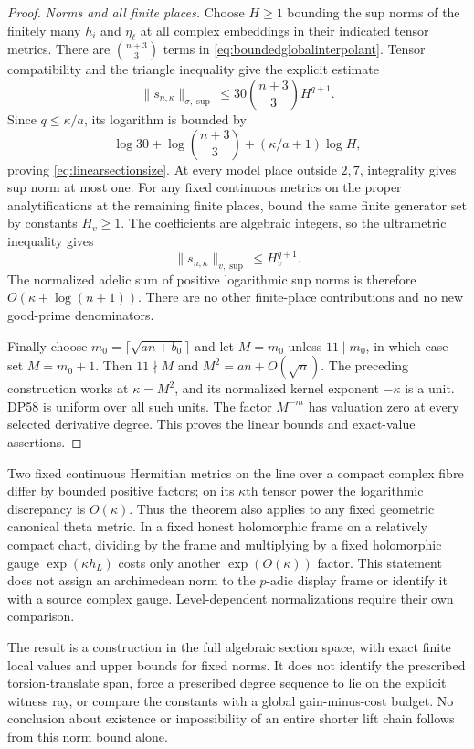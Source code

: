 \begin{proof}
\emph{Norms and all finite places.}
Choose $H\ge1$ bounding the sup norms of the finitely many $h_i$ and $\eta_\ell$ at all complex embeddings in their indicated tensor metrics.
There are $\binom{n+3}{3}$ terms in \eqref{eq:boundedglobalinterpolant}.
Tensor compatibility and the triangle inequality give the explicit estimate
\[
 \|s_{n,\kappa}\|_{\sigma,\sup}
 \le30\binom{n+3}{3}H^{q+1}.
\]
Since $q\le\kappa/a$, its logarithm is bounded by
\[
 \log30+\log\binom{n+3}{3}
       +(\kappa/a+1)\log H,
\]
proving \eqref{eq:linearsectionsize}.
At every model place outside $2,7$, integrality gives sup norm at most one.
For any fixed continuous metrics on the proper analytifications at the remaining finite places, bound the same finite generator set by constants $H_v\ge1$.
The coefficients are algebraic integers, so the ultrametric inequality gives
\[
 \|s_{n,\kappa}\|_{v,\sup}\le H_v^{q+1}.
\]
The normalized adelic sum of positive logarithmic sup norms is therefore $O(\kappa+\log(n+1))$.
There are no other finite-place contributions and no new good-prime denominators.

Finally choose $m_0=\lceil\sqrt{an+b_0}\rceil$ and let $M=m_0$ unless $11\mid m_0$, in which case set $M=m_0+1$.
Then $11\nmid M$ and $M^2=an+O(\sqrt n)$.
The preceding construction works at $\kappa=M^2$, and its normalized kernel exponent $-\kappa$ is a unit.
DP58 is uniform over all such units.
The factor $M^{-m}$ has valuation zero at every selected derivative degree.
This proves the linear bounds and exact-value assertions.
\end{proof}

Two fixed continuous Hermitian metrics on the line over a compact complex fibre differ by bounded positive factors; on its $\kappa$th tensor power the logarithmic discrepancy is $O(\kappa)$.
Thus the theorem also applies to any fixed geometric canonical theta metric.
In a fixed honest holomorphic frame on a relatively compact chart, dividing by the frame and multiplying by a fixed holomorphic gauge $\exp(\kappa h_L)$ costs only another $\exp(O(\kappa))$ factor.
This statement does not assign an archimedean norm to the $p$-adic display frame or identify it with a source complex gauge.
Level-dependent normalizations require their own comparison.

The result is a construction in the full algebraic section space, with exact finite local values and upper bounds for fixed norms.
It does not identify the prescribed torsion-translate span, force a prescribed degree sequence to lie on the explicit witness ray, or compare the constants with a global gain-minus-cost budget.
No conclusion about existence or impossibility of an entire shorter lift chain follows from this norm bound alone.
